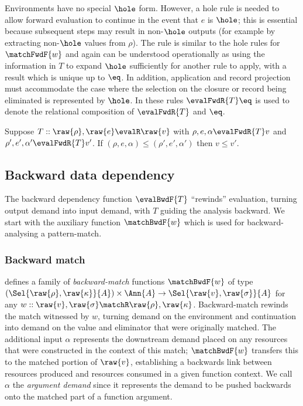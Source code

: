  Environments have no special $\hole$ form. However, a hole rule is needed to allow forward evaluation to continue in the event that $e$ is $\hole$; this is essential because subsequent steps may result in non-$\hole$ outputs (for example by extracting non-$\hole$ values from $\rho$). The rule is similar to the hole rules for $\matchFwdF{w}$ and again can be understood operationally as using the information in $T$ to expand $\hole$ sufficiently for another rule to apply, with a result which is unique up to $\eq$. In addition, application and record projection must accommodate the case where the selection on the closure or record being eliminated is represented by $\hole$. In these rules $\evalFwdR{T}\eq$ is used to denote the relational composition of $\evalFwdR{T}$ and $\eq$.

\begin{lemma}
   Suppose $T :: \raw{\rho}, \raw{e} \evalR \raw{v}$ with $\rho, e, \alpha \evalFwdR{T} v$ and $\rho', e', \alpha' \evalFwdR{T} v'$. If $(\rho, e, \alpha) \leq (\rho', e', \alpha')$ then $v \leq v'$.
\end{lemma}

\subsection{Backward data dependency}
\label{sec:data-dependencies:analyses:bwd}

The backward dependency function $\evalBwdF{T}$ ``rewinds'' evaluation, turning output demand into input demand, with $T$ guiding the analysis backward. We start with the auxiliary function $\matchBwdF{w}$ which is used for backward-analysing a pattern-match.

\subsubsection{Backward match}
\label{sec:data-dependencies:analyses:bwd:pattern-match}

 defines a family of \emph{backward-match} functions $\matchBwdF{w}$ of type $(\Sel{\raw{\rho}, \raw{\kappa}}{A}) \times \Ann{A} \to \Sel{\raw{v}, \raw{\sigma}}{A}$ for any $w :: \raw{v}, \raw{\sigma} \matchR \raw{\rho}, \raw{\kappa}$. Backward-match rewinds the match witnessed by $w$, turning demand on the environment and continuation into demand on the value and eliminator that were originally matched. The additional input $\alpha$ represents the downstream demand placed on any resources that were constructed in the context of this match; $\matchBwdF{w}$ transfers this to the matched portion of $\raw{v}$, establishing a backwards link between resources produced and resources consumed in a given function context. We call $\alpha$ the \emph{argument demand} since it represents the demand to be pushed backwards onto the matched part of a function argument.

